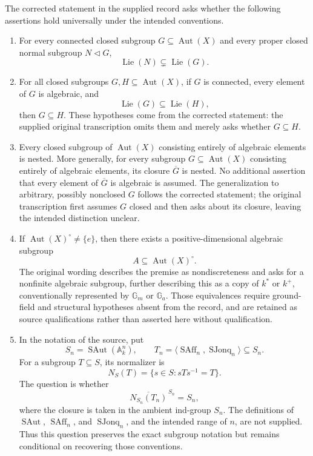 \documentclass[11pt]{article}
\begin{document}
The corrected statement in the supplied record asks whether the following assertions hold universally under the intended conventions.
\begin{enumerate}
\item For every connected closed subgroup \(G\subseteq\operatorname{Aut}(X)\) and every proper closed normal subgroup \(N\triangleleft G\),
\[
\operatorname{Lie}(N)\subsetneq\operatorname{Lie}(G).
\]
\item For all closed subgroups \(G,H\subseteq\operatorname{Aut}(X)\), if \(G\) is connected, every element of \(G\) is algebraic, and
\[
\operatorname{Lie}(G)\subseteq\operatorname{Lie}(H),
\]
then \(G\subseteq H\). These hypotheses come from the corrected statement: the supplied original transcription omits them and merely asks whether \(G\subseteq H\).
\item Every closed subgroup of \(\operatorname{Aut}(X)\) consisting entirely of algebraic elements is nested. More generally, for every subgroup \(G\subseteq\operatorname{Aut}(X)\) consisting entirely of algebraic elements, its closure \(\overline G\) is nested. No additional assertion that every element of \(\overline G\) is algebraic is assumed. The generalization to arbitrary, possibly nonclosed \(G\) follows the corrected statement; the original transcription first assumes \(G\) closed and then asks about its closure, leaving the intended distinction unclear.
\item If \(\operatorname{Aut}(X)^\circ\neq\{e\}\), then there exists a positive-dimensional algebraic subgroup
\[
A\subseteq\operatorname{Aut}(X)^\circ.
\]
The original wording describes the premise as nondiscreteness and asks for a nonfinite algebraic subgroup, further describing this as a copy of \(k^*\) or \(k^+\), conventionally represented by \(\mathbb G_m\) or \(\mathbb G_a\). Those equivalences require ground-field and structural hypotheses absent from the record, and are retained as source qualifications rather than asserted here without qualification.
\item In the notation of the source, put
\[
S_n=\operatorname{SAut}(\mathbb A_k^n),\qquad
T_n=\langle\operatorname{SAff}_n,\operatorname{SJonq}_n\rangle\subseteq S_n.
\]
For a subgroup \(T\subseteq S\), its normalizer is
\[
N_S(T)=\{s\in S:sTs^{-1}=T\}.
\]
The question is whether
\[
\overline{N_{S_n}(T_n)}^{\,S_n}=S_n,
\]
where the closure is taken in the ambient ind-group \(S_n\). The definitions of \(\operatorname{SAut}\), \(\operatorname{SAff}_n\), and \(\operatorname{SJonq}_n\), and the intended range of \(n\), are not supplied. Thus this question preserves the exact subgroup notation but remains conditional on recovering those conventions.
\end{enumerate}
\end{document}
